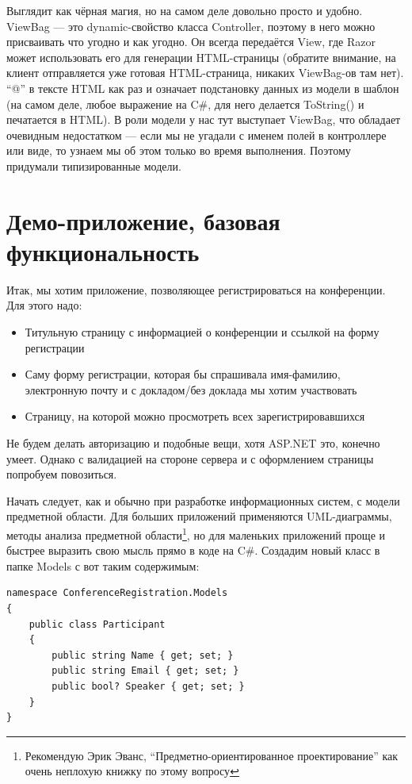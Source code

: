 \documentclass[a5paper]{article}
\begin{document}
Выглядит как чёрная магия, но на самом деле довольно просто и удобно. ViewBag --- это dynamic-свойство класса Controller, поэтому в него можно присваивать что угодно и как угодно. Он всегда передаётся View, где Razor может использовать его для генерации HTML-страницы 
(обратите внимание, на клиент отправляется уже готовая HTML-страница, никаких ViewBag-ов там нет). ``@'' в тексте HTML как раз и означает подстановку данных из модели в шаблон (на самом деле, любое выражение на C\#, для него делается ToString() и печатается в HTML). В роли модели у нас тут
выступает ViewBag, что обладает очевидным недостатком --- если мы не угадали с именем полей в контроллере или виде, то узнаем мы об этом только во время выполнения. Поэтому придумали типизированные модели.

\section{Демо-приложение, базовая функциональность}

Итак, мы хотим приложение, позволяющее регистрироваться на конференции. Для этого надо:
\begin{itemize}
	\item Титульную страницу с информацией о конференции и ссылкой на форму регистрации
	\item Саму форму регистрации, которая бы спрашивала имя-фамилию, электронную почту и с докладом/без доклада мы хотим участвовать
	\item Страницу, на которой можно просмотреть всех зарегистрировавшихся
\end{itemize}

Не будем делать авторизацию и подобные вещи, хотя ASP.NET это, конечно умеет. Однако с валидацией на стороне сервера и с оформлением страницы попробуем повозиться.

Начать следует, как и обычно при разработке информационных систем, с модели предметной области. Для больших приложений применяются UML-диаграммы, методы анализа предметной области\footnote{Рекомендую Эрик Эванс, ``Предметно-ориентированное проектирование'' как очень неплохую книжку по этому вопросу},
но для маленьких приложений проще и быстрее выразить свою мысль прямо в коде на C\#. Создадим новый класс в папке Models с вот таким содержимым:

\begin{verbatim}
namespace ConferenceRegistration.Models
{
    public class Participant
    {
        public string Name { get; set; }
        public string Email { get; set; }
        public bool? Speaker { get; set; }
    }
}
\end{verbatim}
\end{document}
